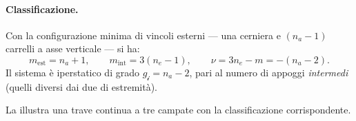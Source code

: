 \paragraph{Classificazione.}
Con la configurazione minima di vincoli esterni ---
una cerniera e $(n_a - 1)$ carrelli a asse verticale
--- si ha:
\begin{equation}\label{eq:class_trave_continua}
m_{\text{est}} = n_a + 1, \qquad
m_{\text{int}} = 3(n_e - 1), \qquad
\nu = 3n_e - m = -(n_a - 2).
\end{equation}
Il sistema è iperstatico di grado $g_{\mathscr{i}} = n_a - 2$,
pari al numero di appoggi \emph{intermedi} (quelli diversi
dai due di estremità).

La  illustra una trave
continua a tre campate con la classificazione corrispondente.


